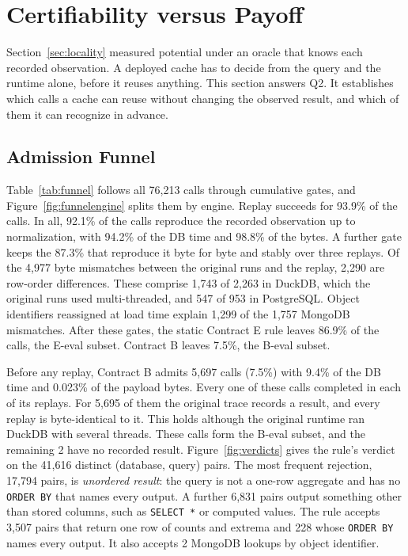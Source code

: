 \section{Certifiability versus Payoff}
\label{sec:certify}

Section~\ref{sec:locality} measured potential under an oracle that knows each recorded observation. A deployed cache
has to decide from the query and the runtime alone, before it reuses anything. This section answers Q2. It
establishes which calls a cache can reuse without changing the observed result, and which of them it can recognize
in advance.




\subsection{Admission Funnel}
\label{sec:funnel}

Table~\ref{tab:funnel} follows all 76,213 calls through cumulative gates, and Figure~\ref{fig:funnelengine} splits
them by engine. Replay succeeds for 93.9\% of the calls. In all, 92.1\% of the calls reproduce the recorded
observation up to normalization, with 94.2\% of the DB time and 98.8\% of the bytes. A further gate keeps the 87.3\%
that reproduce it byte for byte and stably over three replays. Of the 4,977 byte mismatches between the original
runs and the replay, 2,290 are row-order differences. These comprise 1,743 of 2,263 in DuckDB, which the original
runs used multi-threaded, and 547 of 953 in PostgreSQL. Object identifiers reassigned at load time explain 1,299 of
the 1,757 MongoDB mismatches. After these gates, the static Contract E rule leaves 86.9\% of the calls, the E-eval
subset. Contract B leaves 7.5\%, the B-eval subset.

Before any replay, Contract B admits 5,697 calls (7.5\%) with 9.4\% of the DB time and 0.023\% of the payload bytes.
Every one of these calls completed in each of its replays. For 5,695 of them the original trace records a result,
and every replay is byte-identical to it. This holds although the original runtime ran DuckDB with several threads.
These calls form the B-eval subset, and the remaining 2 have no recorded result. Figure~\ref{fig:verdicts} gives the
rule's verdict on the 41,616 distinct (database, query) pairs. The most frequent rejection, 17,794 pairs, is
\emph{unordered result}: the query is not a one-row aggregate and has no \texttt{ORDER BY} that names every output.
A further 6,831 pairs output something other than stored columns, such as \texttt{SELECT *} or computed values. The
rule accepts 3,507 pairs that return one row of counts and extrema and 228 whose \texttt{ORDER BY} names every
output. It also accepts 2 MongoDB lookups by object identifier.

